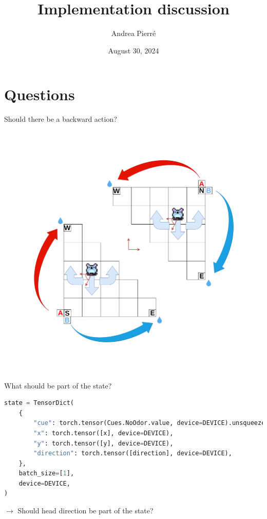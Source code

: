 \documentclass[bigger]{beamer}
\author{Andrea Pierré}
\date{August 30, 2024}
\title{Implementation discussion}
\institute{Brown University}
\begin{document}
\maketitle
\section{Questions}
\label{sec:orgd4357fa}
\begin{frame}[label={sec:orgc284d02}]{Should there be a backward action?}
\begin{center}
\includegraphics[height=0.8\textheight]{img/RL_env-cartesian-polar.drawio.pdf}
\end{center}
\end{frame}
\begin{frame}[label={sec:org33cbc9f},fragile]{What should be part of the state?}
\scriptsize
\begin{lstlisting}[language={Python}]
state = TensorDict(
    {
        "cue": torch.tensor(Cues.NoOdor.value, device=DEVICE).unsqueeze(-1),
        "x": torch.tensor([x], device=DEVICE),
        "y": torch.tensor([y], device=DEVICE),
        "direction": torch.tensor([direction], device=DEVICE),
    },
    batch_size=[1],
    device=DEVICE,
)
\end{lstlisting}
\normalsize
\(\to\) Should head direction be part of the state?
\end{frame}
\end{document}
